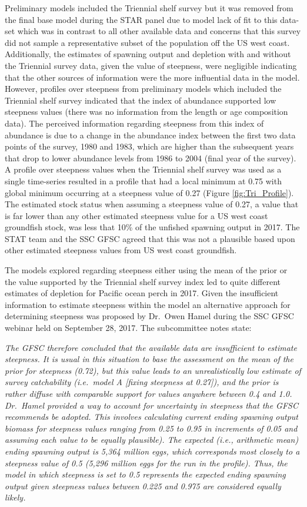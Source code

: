 \documentclass[12pt,]{article}
\begin{document}
Preliminary models included the Triennial shelf survey but it was
removed from the final base model during the STAR panel due to model
lack of fit to this data-set which was in contrast to all other
available data and concerns that this survey did not sample a
representative subset of the population off the US west coast.
Additionally, the estimates of spawning output and depletion with and
without the Triennial survey data, given the value of steepness, were
negligible indicating that the other sources of information were the
more influential data in the model. However, profiles over steepness
from preliminary models which included the Triennial shelf survey
indicated that the index of abundance supported low steepness values
(there was no information from the length or age composition data). The
perceived information regarding steepness from this index of abundance
is due to a change in the abundance index between the first two data
points of the survey, 1980 and 1983, which are higher than the
subsequent years that drop to lower abundance levels from 1986 to 2004
(final year of the survey). A profile over steepness values when the
Triennial shelf survey was used as a single time-series resulted in a
profile that had a local minimum at 0.75 with global minimum occurring
at a steepness value of 0.27 (Figure \ref{fig:Tri_Profile}). The
estimated stock status when assuming a steepness value of 0.27, a value
that is far lower than any other estimated steepness value for a US west
coast groundfish stock, was less that 10\% of the unfished spawning
output in 2017. The STAT team and the SSC GFSC agreed that this was not
a plausible based upon other estimated steepness values from US west
coast groundfish.

The models explored regarding steepness either using the mean of the
prior or the value supported by the Triennial shelf survey index led to
quite different estimates of depletion for Pacific ocean perch in 2017.
Given the insufficient information to estimate steepness within the
model an alternative approach for determining steepness was proposed by
Dr.~Owen Hamel during the SSC GFSC webinar held on September 28, 2017.
The subcommittee notes state:

\emph{The GFSC therefore concluded that the available data are
insufficient to estimate steepness. It is usual in this situation to
base the assessment on the mean of the prior for steepness (0.72), but
this value leads to an unrealistically low estimate of survey
catchability (i.e.~model A {[}fixing steepness at 0.27{]}), and the
prior is rather diffuse with comparable support for values anywhere
between 0.4 and 1.0. Dr.~Hamel provided a way to account for uncertainty
in steepness that the GFSC recommends be adopted. This involves
calculating current ending spawning output biomass for steepness values
ranging from 0.25 to 0.95 in increments of 0.05 and assuming each value
to be equally plausible). The expected (i.e., arithmetic mean) ending
spawning output is 5,364 million eggs, which corresponds most closely to
a steepness value of 0.5 (5,296 million eggs for the run in the
profile). Thus, the model in which steepness is set to 0.5 represents
the expected ending spawning output given steepness values between 0.225
and 0.975 are considered equally likely.}
\end{document}

